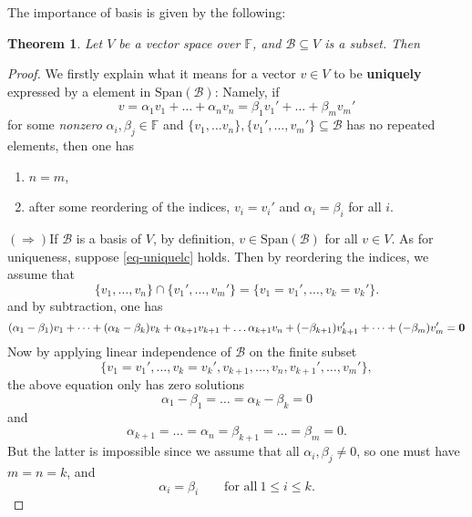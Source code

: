 \documentclass[12pt]{amsbook}
\newtheorem{theorem}{Theorem}[section]
\begin{document}
The importance of basis is given by the following:
\begin{theorem} \label{thm-uniquesum}
    Let $V$ be a vector space over $\mathbb{F}$, and $\mathcal{B} \subseteq V$ is a subset. Then 
    \begin{center}
    \end{center}
\end{theorem}
\begin{proof}
    We firstly explain what it means for a vector $v \in V$ to be {\bf uniquely} expressed by a element in $\mathrm{Span}(\mathcal{B})$: Namely, if 
    \begin{equation} \label{eq-uniquelc}
    v = \alpha_1v_1 + \dots + \alpha_nv_n = \beta_1v_1' + \dots + \beta_mv_m' \tag{*}
    \end{equation}
    for some {\it nonzero} $\alpha_i, \beta_j \in \mathbb{F}$ and $\{v_1, \dots v_n\}, \{v_1', \dots, v_m'\} \subseteq \mathcal{B}$ has no repeated elements, then one has 
    \begin{enumerate}
        \item $n = m$,
        \item after some reordering of the indices, $v_i = v_i'$ and $\alpha_i = \beta_i$ for all $i$.
    \end{enumerate}
    

    \noindent $(\Rightarrow) $If $\mathcal{B}$ is a basis of $V$, by definition, $v \in\mathrm{Span}(\mathcal{B})$ for all $v \in V$. As for uniqueness, suppose \eqref{eq-uniquelc} holds. Then by reordering the indices, we assume that
    $$\{v_1,\dots, v_n\} \cap \{v_1', \dots, v_m'\} = \{v_1 = v_1', \dots, v_k = v_k'\}.$$
    and by subtraction, one has
    $$(\alpha_1 - \beta_1)v_1 + \dots + (\alpha_k - \beta_k) v_k + \alpha_{k+1} v_{k+1} + \dots \alpha_{k+1} v_{n} + (-\beta_{k+1})v_{k+1}' + \dots + (-\beta_{m}) v_{m}' = {\bf 0}$$
    Now by applying linear independence of $\mathcal{B}$ on the finite subset
    $$\{v_1 = v_1', \dots, v_k = v_k', v_{k+1}, \dots, v_n, v_{k+1}', \dots, v_m'\},$$
    the above equation only has zero solutions
    $$\alpha_1 - \beta_1 = \dots = \alpha_k - \beta_k = 0$$
    and
    $$\alpha_{k+1} = \dots =\alpha_n = \beta_{k+1} = \dots = \beta_m = 0.$$ But the latter is impossible since we assume that all $\alpha_i, \beta_j \neq 0$, so one must have $m = n = k$, and 
    $$\alpha_i = \beta_i \quad \quad \text{for all}\ 1 \leq i \leq k.$$


\end{proof}
\end{document}
